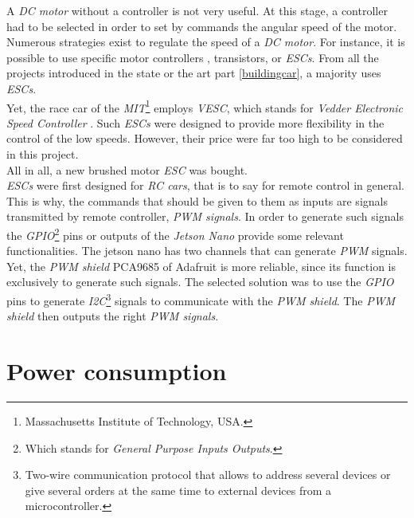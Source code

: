 		A \textit{DC motor} without a controller is not very useful. At this 
		stage, a controller had to be selected in order to set by commands
		the angular speed of the motor.
		Numerous strategies exist to regulate the speed of a \textit{DC motor}.
		For instance, it is possible to use specific motor controllers \cite{f1tenth}, 
		transistors, or \textit{ESCs}. From all the projects introduced
		in the state or the art part \vref{buildingcar}, a majority 
		uses \textit{ESCs}.
		\\\indent Yet, the race car of the \textit{MIT}\footnote{Massachusetts Institute
		of Technology, USA.} employs \textit{VESC}, which stands for \textit{Vedder 
		Electronic Speed Controller} \cite{mitracecar}. Such \textit{ESCs} were designed
		to provide more flexibility in the control of the low speeds. However, their price
		were far too high to be considered in this project.
		\\\indent All in all, a new brushed motor \textit{ESC} was bought.
		\\\indent \textit{ESCs} were first designed for \textit{RC cars}, that is to say for 
		remote control in general. This is why, the commands that should be given to them
		as inputs are signals transmitted by remote controller, \textit{PWM signals}. In order
		to generate such signals the \textit{GPIO}\footnote{Which stands for \textit{General Purpose Inputs Outputs}.}
		pins or outputs of the \textit{Jetson Nano} 
		provide some relevant functionalities. The jetson nano has two channels that
		can generate \textit{PWM} signals. Yet, the \textit{PWM shield}  PCA9685
		of Adafruit is more reliable, since its function is exclusively to generate
		such signals. The selected solution was to use the \textit{GPIO} pins 
		to generate \textit{I2C}\footnote{Two-wire communication 
		protocol that allows to address several devices or give several 
		orders at the same time to external devices from a microcontroller.} signals to communicate
		with the \textit{PWM shield}. The \textit{PWM shield}
		then outputs the right \textit{PWM signals}.\cite{tk1servo,nanogpio,nanogpiolayout} 
	
	\section{Power consumption}
		
